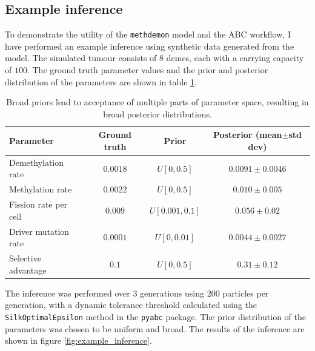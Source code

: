 \subsection{Example inference}
To demonstrate the utility of the \texttt{methdemon} model and the ABC workflow,
I have performed an example inference using synthetic data generated from the
model. The simulated tumour consists of $8$ demes, each with a carrying capacity
of $100$. The ground truth parameter values and the prior and posterior
distribution of the parameters are shown in table \ref{table:example_inference}.
\begin{table}[htbp]
    \centering
    \begin{tabularx}{\textwidth}{|X|c|c|c|}
        \hline
        Parameter & Ground truth & Prior & Posterior (mean$\pm$std dev) \\ \hline
        Demethylation rate & $0.0018$ & $U[0, 0.5]$ & $0.0091 \pm 0.0046$ \\
        \hline
        Methylation rate & $0.0022$ & $U[0, 0.5]$ & $0.010 \pm 0.005$ \\ \hline
        Fission rate per cell & $0.009$ & $U[0.001, 0.1]$ & $0.056\pm 0.02$ \\
        \hline
        Driver mutation rate & $0.0001$ & $U[0, 0.01]$ & $0.0044 \pm 0.0027$ \\
        \hline
        Selective advantage & $0.1$ & $U[0, 0.5]$ & $0.31\pm0.12$ \\ \hline
    \end{tabularx}
    \caption{Broad priors lead to acceptance of multiple parts of parameter
    space, resulting in broad posterior distributions.}
    \label{table:example_inference}
\end{table}
The inference was performed over $3$ generations using $200$ particles per
generation, with a dynamic tolerance threshold calculated using the
\texttt{SilkOptimalEpsilon} method in the \texttt{pyabc} package. The prior
distribution of the parameters was chosen to be uniform and broad. The results
of the inference are shown in figure \ref{fig:example_inference}.
